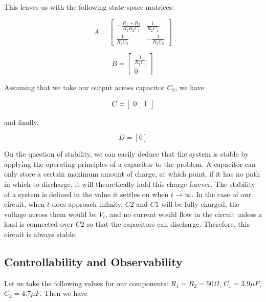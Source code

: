 \documentclass[a4paper, 12pt]{article}
\begin{document}
This leaves us with the following state-space matrices:

\begin{equation}
  A = \left[
  \begin{array}{cc}
    -\frac{R_1 + R_2}{R_1 R_2 C_1} & \frac{1}{R_2 C_1} \\
    \frac{1}{R_2 C_2} & -\frac{1}{R_2 C_2}
  \end{array}
  \right]
  \label{eq:ss_A}
\end{equation}

\begin{equation}
  B = \left[
  \begin{array}{c}
    \frac{1}{R_1 C_1} \\
    0
  \end{array}
  \right]
  \label{eq:ss_B}
\end{equation}

Assuming that we take our output across capacitor $C_2$, we have

\begin{equation}
  C = \left[
  \begin{array}{c c}
    0 & 1
  \end{array}
  \right]
  \label{eq:ss_C}
\end{equation}

and finally,

\begin{equation}
  D = \left[ 0 \right]
  \label{eq:ss_D}
\end{equation}

On the question of stability, we can easily deduce that the system is stable by
applying the operating principles of a capacitor to the problem. A capacitor
can only store a certain maximum amount of charge, at which point, if it has no
path in which to discharge, it will theoretically hold this charge forever. The
stability of a system is defined in the value it settles on when $t \rightarrow
\infty$. In the case of our circuit, when $t$ does approach infinity, $C2$ and
$C1$ will be fully charged, the voltage across them would be $V_i$, and no
current would flow in the circuit unless a load is connected over $C2$ so that
the capacitors can discharge. Therefore, this circuit is always stable.

\subsection{Controllability and Observability}

Let us take the following values for our components: $R_1 = R_2 = 50\Omega$,
$C_1 = 3.9 \mu F$, $C_2 = 4.7 \mu F$. Then we have
\end{document}
